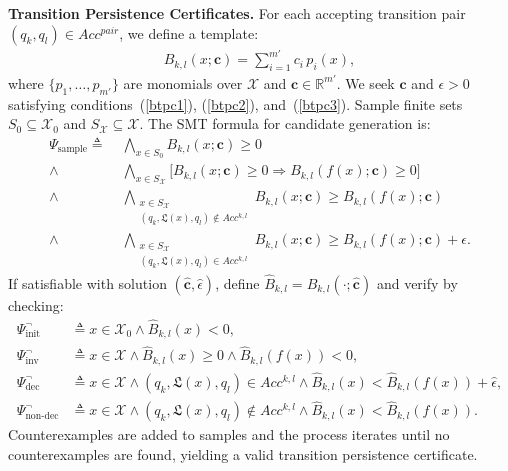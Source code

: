 \textbf{Transition Persistence Certificates.} For each accepting transition pair $(q_k, q_l) \in Acc^{pair}$, we define a template:
\begin{align}
B_{k,l}(x; \mathbf{c}) = \sum_{i=1}^{m'} c_i \, p_i(x),
\end{align}
where $\{p_1, \ldots, p_{m'}\}$ are monomials over $\mathcal{X}$ and $\mathbf{c} \in \mathbb{R}^{m'}$. We seek $\mathbf{c}$ and $\epsilon > 0$ satisfying conditions~(\ref{btpc1}), (\ref{btpc2}), and~(\ref{btpc3}). Sample finite sets $S_0 \subseteq \mathcal{X}_0$ and $S_{\mathcal{X}} \subseteq \mathcal{X}$. The SMT formula for candidate generation is:
\begin{align}
  \Psi_{\text{sample}} \triangleq \;
  &\bigwedge_{x \in S_0} B_{k,l}(x; \mathbf{c}) \geq 0 \label{smt:tp-init} \\
  \wedge \; &\bigwedge_{x \in S_{\mathcal{X}}} \big[ B_{k,l}(x; \mathbf{c}) \geq 0 \Rightarrow B_{k,l}(f(x); \mathbf{c}) \geq 0 \big] \label{smt:tp-inv} \\
  \wedge \; &\bigwedge_{\substack{x \in S_{\mathcal{X}} \\ (q_k, \mathfrak{L}(x), q_l) \notin Acc^{k,l}}} B_{k,l}(x; \mathbf{c}) \geq B_{k,l}(f(x); \mathbf{c}) \label{smt:tp-non-dec} \\
  \wedge \; &\bigwedge_{\substack{x \in S_{\mathcal{X}} \\ (q_k, \mathfrak{L}(x), q_l) \in Acc^{k,l}}} B_{k,l}(x; \mathbf{c}) \geq B_{k,l}(f(x); \mathbf{c}) + \epsilon. \label{smt:tp-dec}
\end{align}
If satisfiable with solution $(\hat{\mathbf{c}}, \hat{\epsilon})$, define $\hat{B}_{k,l} = B_{k,l}(\cdot; \hat{\mathbf{c}})$ and verify by checking:
\begin{align}
  \Psi_{\text{init}}^{\neg} &\triangleq x \in \mathcal{X}_0 \land \hat{B}_{k,l}(x) < 0, \label{smt:tp-cex-init} \\
  \Psi_{\text{inv}}^{\neg} &\triangleq x \in \mathcal{X} \land \hat{B}_{k,l}(x) \geq 0 \land \hat{B}_{k,l}(f(x)) < 0, \label{smt:tp-cex-inv} \\
  \Psi_{\text{dec}}^{\neg} &\triangleq x \in \mathcal{X} \land (q_k, \mathfrak{L}(x), q_l) \in Acc^{k,l} \land \hat{B}_{k,l}(x) < \hat{B}_{k,l}(f(x)) + \hat{\epsilon}, \label{smt:tp-cex-dec} \\
  \Psi_{\text{non-dec}}^{\neg} &\triangleq x \in \mathcal{X} \land (q_k, \mathfrak{L}(x), q_l) \notin Acc^{k,l} \land \hat{B}_{k,l}(x) < \hat{B}_{k,l}(f(x)). \label{smt:tp-cex-non-dec}
\end{align}
Counterexamples are added to samples and the process iterates until no counterexamples are found, yielding a valid transition persistence certificate.
